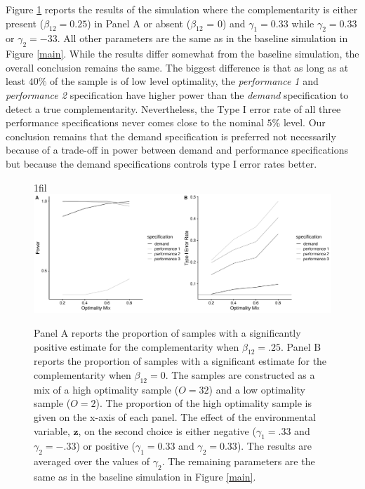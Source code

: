 \documentclass[12pt]{article}
\makeatletter
\newcommand*{\centerfloat}{%
  \parindent \z@
  \leftskip \z@ \@plus 1fil \@minus \textwidth
  \rightskip\leftskip
  \parfillskip \z@skip}
\makeatother
\begin{document}
Figure \ref{mixed-optimality} reports the results of the simulation where the complementarity is either present ($\beta_{12} = 0.25$) in Panel A or absent ($\beta_{12}$ = 0) and $\gamma_1 = 0.33$ while $\gamma_2 = 0.33$ or $\gamma_2 = -33$. All other parameters are the same as in the baseline simulation in Figure \ref{main}. While the results differ somewhat from the baseline simulation, the overall conclusion remains the same. The biggest difference is that as long as at least $40\%$ of the sample is of low level optimality, the \emph{performance 1} and \emph{performance 2} specification have higher power than the \emph{demand} specification to detect a true complementarity. Nevertheless, the Type I error rate of all three performance specifications never comes close to the nominal $5\%$ level. Our conclusion remains that the demand specification is preferred not necessarily because of a trade-off in power between demand and performance specifications but because the demand specifications controls type I error rates better.

\begin{figure}
\centerfloat
\includegraphics[width=450px]{figure-latex/mixed_optimality.pdf}
\caption[Error Rate and Power with Mixed Optimality Samples]
{\label{mixed-optimality} Panel A reports the proportion of samples with a significantly positive estimate for the complementarity when $\beta_{12} = .25$. Panel B reports the proportion of samples with a significant estimate for the complementarity when $\beta_{12} = 0$. The samples are constructed as a mix of a high optimality sample ($O=32$) and a low optimality sample ($O=2$). The proportion of the high optimality sample is given on the x-axis of each panel. The effect of the environmental variable, $\mathbf{z}$, on the second choice is either negative ($\gamma_1 = .33$ and $\gamma_2 = -.33$) or positive ($\gamma_1 = 0.33$ and $\gamma_2 = 0.33$). The results are averaged over the values of $\gamma_2$. The remaining parameters are the same as in the baseline simulation in Figure \ref{main}.}
\end{figure}
\end{document}
